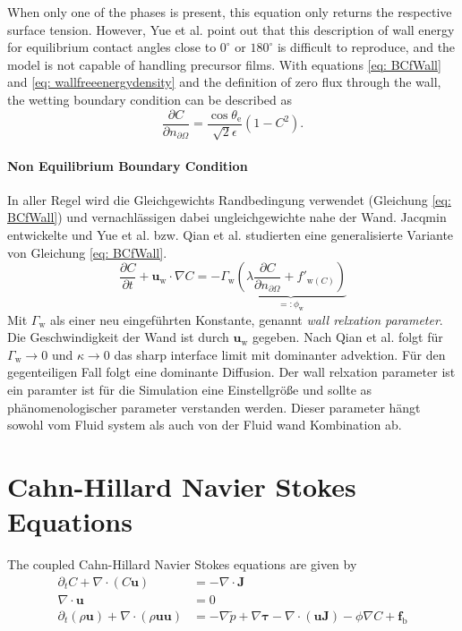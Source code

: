 When only one of the phases is present, this equation only returns the respective surface tension. However, Yue et al. \cite{yue2011WallEnergyRelaxation} point out that this description of wall energy for equilibrium contact angles close to $0^{\circ}$ or $180^{\circ}$ is difficult to reproduce, and the model is not capable of handling precursor films.
With equations \ref{eq: BCfWall} and \ref{eq: wallfreeenergydensity} and the definition of zero flux through the wall, the wetting boundary condition can be described as
\begin{equation}
    \frac{\partial C}{\partial n_{\partial\Omega}} = \frac{\cos \theta_{\mathrm{e}}}{\sqrt{2}\epsilon}(1-C^2).
\end{equation}

\paragraph{Non Equilibrium Boundary Condition}
\label{sec: nonEquiBC}
In aller Regel wird die Gleichgewichts Randbedingung verwendet (Gleichung \ref{eq: BCfWall}) und vernachlässigen dabei ungleichgewichte nahe der Wand. Jacqmin \cite{jacqmin2000ContactlineDynamicsDiffuse} entwickelte und Yue et al. \cite{yue2011WallEnergyRelaxation} bzw. Qian et al. \cite{qian2006VariationalApproachMoving} studierten eine generalisierte Variante von Gleichung \ref{eq: BCfWall}.
\begin{equation}
    \frac{\partial C}{\partial t} + \mathbf{u}_{\mathrm{w}}\cdot \nabla C = -\Gamma_{\mathrm{w}} \underbrace{\left(\lambda \frac{\partial C}{\partial n_{\partial \Omega}}+f'_{\mathrm{w}(C)}\right)}_{=:\phi_{\mathrm{w}}}
\end{equation}
Mit $\Gamma_{\mathrm{w}}$ als einer neu eingeführten Konstante, genannt \textit{wall relxation parameter}. Die Geschwindigkeit der Wand ist durch $\mathbf{u}_{\mathrm{w}}$ gegeben. Nach Qian et al. \cite{qian2006VariationalApproachMoving} folgt für $\Gamma_{\mathrm{w}}\rightarrow 0$ und $\kappa\rightarrow 0$ das sharp interface limit mit dominanter advektion. Für den gegenteiligen Fall folgt eine dominante Diffusion. Der wall relxation parameter ist ein paramter ist für die Simulation eine Einstellgröße und sollte as phänomenologischer parameter verstanden werden. Dieser parameter hängt sowohl vom Fluid system als auch von der Fluid wand Kombination ab\cite{jacqmin2000ContactlineDynamicsDiffuse}.

\section{Cahn-Hillard Navier Stokes Equations}
The coupled Cahn-Hillard Navier Stokes equations are given by
\begin{align}
    \partial_t C + \nabla \cdot \left( C \mathbf{u} \right) &= -\nabla \cdot \mathbf{J} \\
    \nabla \cdot \mathbf{u} &= 0 \\
    \label{eq: NSEChanged}
    \partial_t(\rho \mathbf{u}) + \nabla \cdot (\rho \mathbf{u}\mathbf{u})&= -\nabla \tilde{p} + \nabla \mathbf{\tau} - \nabla \cdot(\mathbf{u}\mathbf{J})-\phi\nabla C + \mathbf{f}_{\mathrm{b}}
\end{align}

